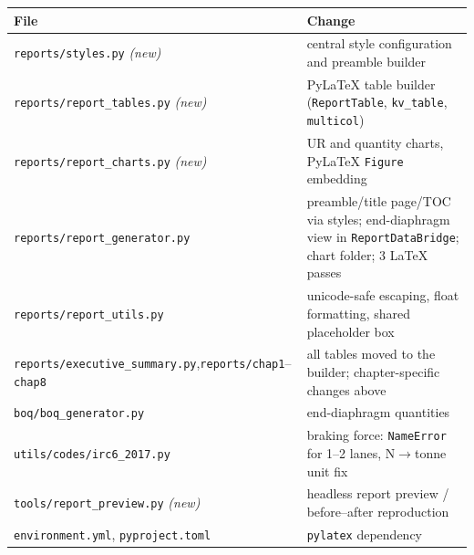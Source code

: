 \documentclass[11pt,a4paper]{article}
\newcommand{\code}[1]{\texttt{\small #1}}
\begin{document}
\begin{table}[H]
\centering\small
\begin{tabularx}{\linewidth}{>{\raggedright\arraybackslash}p{5.6cm}Y}
\toprule
\textbf{File} & \textbf{Change}\\
\midrule
\code{reports/styles.py} \emph{(new)} & central style configuration and preamble builder\\
\code{reports/report\_tables.py} \emph{(new)} & PyLaTeX table builder (\code{ReportTable}, \code{kv\_table}, \code{multicol})\\
\code{reports/report\_charts.py} \emph{(new)} & UR and quantity charts, PyLaTeX \code{Figure} embedding\\
\code{reports/report\_generator.py} & preamble/title page/TOC via styles; end-diaphragm view in \code{ReportDataBridge}; chart folder; 3 LaTeX passes\\
\code{reports/report\_utils.py} & unicode-safe escaping, float formatting, shared placeholder box\\
\code{reports/executive\_summary.py},\newline \code{reports/chap1}--\code{chap8} & all tables moved to the builder; chapter-specific changes above\\
\code{boq/boq\_generator.py} & end-diaphragm quantities\\
\code{utils/codes/irc6\_2017.py} & braking force: \code{NameError} for 1--2 lanes, N$\to$tonne unit fix\\
\code{tools/report\_preview.py} \emph{(new)} & headless report preview / before--after reproduction\\
\code{environment.yml}, \code{pyproject.toml} & \code{pylatex} dependency\\
\bottomrule
\end{tabularx}
\end{table}
\end{document}
